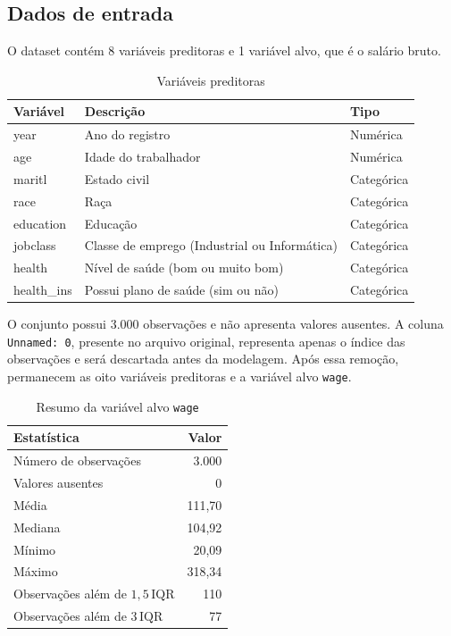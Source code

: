 \subsection{Dados de entrada}

O dataset contém 8 variáveis preditoras e 1 variável alvo, que é o salário bruto.

\begin{table}[htbp]
    \centering
    \caption{Variáveis preditoras}
    \begin{tabular}{|l|l|l|}
        \hline
        \textbf{Variável} & \textbf{Descrição} & \textbf{Tipo} \\ \hline
            year & Ano do registro & Numérica \\ \hline
            age & Idade do trabalhador & Numérica \\ \hline
            maritl & Estado civil & Categórica \\ \hline
            race & Raça & Categórica \\ \hline
            education & Educação & Categórica \\ \hline
            jobclass & Classe de emprego (Industrial ou Informática) & Categórica \\ \hline
            health & Nível de saúde (bom ou muito bom) & Categórica \\ \hline
            health\_ins & Possui plano de saúde (sim ou não) & Categórica \\ \hline
    \end{tabular}
\end{table}

O conjunto possui 3.000 observações e não apresenta valores ausentes. A coluna \texttt{Unnamed: 0}, presente no arquivo original, representa apenas o índice das observações e será descartada antes da modelagem. Após essa remoção, permanecem as oito variáveis preditoras e a variável alvo \texttt{wage}.

\begin{table}[htbp]
    \centering
    \caption{Resumo da variável alvo \texttt{wage}}
    \begin{tabular}{lr}
        \toprule
        \textbf{Estatística} & \textbf{Valor} \\
        \midrule
        Número de observações & 3.000 \\
        Valores ausentes & 0 \\
        Média & 111,70 \\
        Mediana & 104,92 \\
        Mínimo & 20,09 \\
        Máximo & 318,34 \\
        Observações além de $1{,}5\,\mathrm{IQR}$ & 110 \\
        Observações além de $3\,\mathrm{IQR}$ & 77 \\
        \bottomrule
    \end{tabular}
\end{table}

